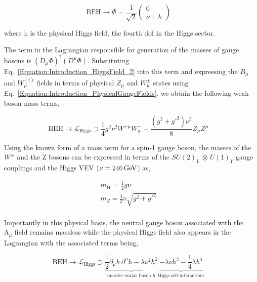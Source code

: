 \begin{equation}
    \text{BEH} \rightarrow \Phi = \frac{1}{\sqrt{2}}\begin{pmatrix}
        0 \\
        \nu + h
    \end{pmatrix} 
    \label{Equation:Introduction_HiggsField_2}
\end{equation}

where h is the physical Higgs field, the fourth dof in the Higgs sector.

The term in the Lagrangian responsible for generation of the masses of gauge bosons is $(D_\mu\Phi)^\dagger(D^\mu\Phi)$. Substituting Eq.~\ref{Equation:Introduction_HiggsField_2} into this term and expressing the $B_\mu$ and $W_{\mu}^{(i)}$ fields in terms of physical $Z_\mu$ and $W_{\mu}^{\pm}$ states using Eq.~\ref{Equation:Introduction_PhysicalGaugeFields}, we obtain the following weak boson mass terms,

\begin{equation}
    \text{BEH} \rightarrow \mathcal{L}_{\text{Higgs}} \supset \frac{1}{4} g^2 \nu^2 W^{+\mu}W_{\mu}^- + \frac{(g^2+g'^2)\nu^2}{8} Z_\mu Z^\mu
\label{Equation:Introduction_HiggsLagrangian_2}
\end{equation}

Using the known form of a mass term for a spin-1 gauge boson, the masses of the $W^\pm$ and the Z bosons can be expressed in terms of the $SU(2)_{L}$ $\otimes$ $U(1)_{Y}$ gauge couplings and the Higgs VEV ($\nu = 246 \,\text{Ge\hspace{-.08em}V}$) as,

\begin{equation}
\begin{array}{c}
    m_W = \frac{1}{2}g\nu \\
    m_Z = \frac{1}{2}\nu\sqrt{g^2+g'^2}\\
\end{array}
\end{equation}

Importantly in this physical basis, the neutral gauge boson associated with the $\text{A}_\mu$ field remains massless while the physical Higgs field also appears in the Lagrangian with the associated terms being,

\begin{equation}
    \text{BEH} \rightarrow \mathcal{L}_{\text{Higgs}} \supset \underbrace{\frac{1}{2} \partial_\mu h \, \partial^\mu h - \lambda \nu^2 h^2}_{\text{massive scalar boson } h}
    \underbrace{- \lambda \nu h^3 - \frac{1}{4} \lambda h^4}_{\text{Higgs self-interactions}}
\label{Equation:Introduction_HiggsLagrangian_3}
\end{equation}

